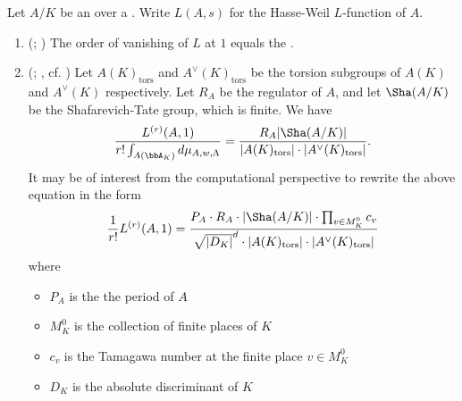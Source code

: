 \begin{conjecture} \label{conjecture:BSD_conjecture_for_an_abelian_variety_over_a_number_field}
    Let $A/K$ be an  over a . Write $L(A,s)$ for the Hasse-Weil $L$-function of $A$. 
    \begin{enumerate}
        \item (; {\cite[(A)]{tate_ocbsdga}}) The order of vanishing of $L$ at $1$ equals the .
        \item (; {\cite[(B)]{tate_ocbsdga}}, cf. {\cite[Conjecture 3.15]{jorza_bsdcavnf}}) Let $A(K)_{\mathrm{tors}}$ and $A^\vee(K)_{\mathrm{tors}}$ be the torsion subgroups of $A(K)$ and $A^\vee(K)$ respectively. Let $R_A$ be the regulator of $A$, and let $\Sha(A/K)$ be the Shafarevich-Tate group, which is finite. We have 
        $$\frac{L^{(r)}(A,1)}{r! \int_{A(\bbA_K)} d\mu_{A,w,\Lambda} } = \frac{R_A|\Sha(A/K)|}{|A(K)_{\mathrm{tors}}| \cdot |A^\vee(K)_{\mathrm{tors}}|}.$$
        It may be of interest from the computational perspective to rewrite the above equation in the form
        $$\frac{1}{r!} L^{(r)}(A,1) = \frac{P_A \cdot R_A \cdot |\Sha(A/K)| \cdot \prod_{v \in M_K^0} c_v}{\sqrt{|D_K|}^d \cdot |A(K)_{\mathrm{tors}}| \cdot |A^\vee(K)_{\mathrm{tors}}|} $$
        where 
        \begin{itemize}
            \item $P_A$ is the the period of $A$
            \item $M_K^0$ is the collection of finite places of $K$
            \item $c_v$ is the Tamagawa number at the finite place $v \in M_K^0$
            \item $D_K$ is the absolute discriminant of $K$
        \end{itemize}
    \end{enumerate} 
\end{conjecture}